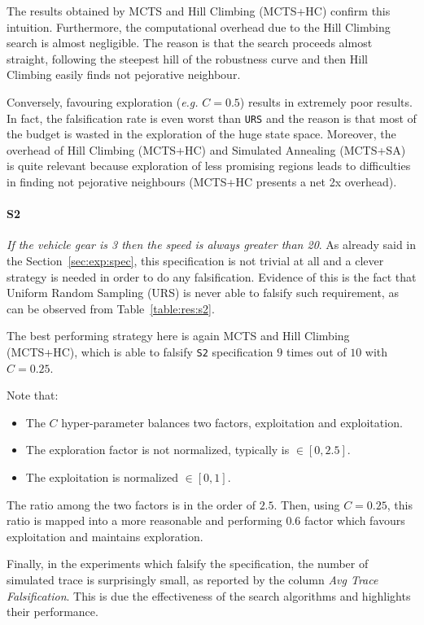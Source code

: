 \documentclass[11pt]{article}
\begin{document}
The results obtained by MCTS and Hill Climbing (MCTS+HC) confirm this intuition. Furthermore, the computational overhead due to the Hill Climbing search is almost negligible. The reason is that the search proceeds almost straight, following the steepest hill of the robustness curve and then Hill Climbing easily finds not pejorative neighbour. 

Conversely, favouring exploration (\textit{e.g.} $C=0.5$) results in extremely poor results. In fact, the falsification rate is even worst than \texttt{URS} and the reason is that most of the budget is wasted in the exploration of the huge state space. Moreover, the overhead of Hill Climbing (MCTS+HC) and Simulated Annealing (MCTS+SA) is quite relevant because exploration of less promising regions leads to difficulties in finding not pejorative neighbours (MCTS+HC presents a net 2x overhead).

\paragraph{S2} \textit{If the vehicle gear is 3 then the speed is always greater than 20}.
As already said in the Section~\ref{sec:exp:spec}, this specification is not trivial at all and a clever strategy is needed in order to do any falsification.
Evidence of this is the fact that Uniform Random Sampling (URS) is never able to falsify such requirement, as can be observed from Table~\ref{table:res:s2}.

The best performing strategy here is again MCTS and Hill Climbing (MCTS+HC), which is able to falsify \texttt{S2} specification $9$ times out of $10$ with $C=0.25$.

Note that:
\begin{itemize}
    \item The $C$ hyper-parameter balances two factors, exploitation and exploitation.
    \item The exploration factor is not normalized, typically is $\in [0,2.5]$.
    \item The exploitation is normalized $\in [0,1]$.
\end{itemize}
The ratio among the two factors is in the order of $2.5$. Then, using $C=0.25$, this ratio is mapped into a more reasonable and performing $0.6$ factor which favours exploitation and maintains exploration.

Finally, in the experiments which falsify the specification, the number of simulated trace is surprisingly small, as reported by the column \textit{Avg Trace Falsification}. This is due the effectiveness of the search algorithms and highlights their performance.
\end{document}
